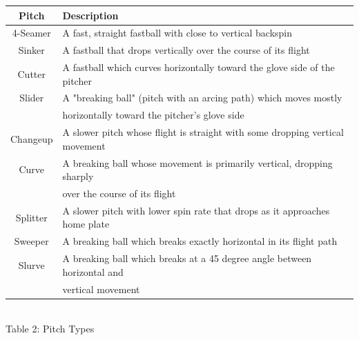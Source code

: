 \documentclass[12 pt]{article}
\begin{document}
\begin{center}
    \begin{tabular}{||c | l||} 
     \hline
     Pitch & Description  \\ [0.5ex] 
     \hline
     4-Seamer & A fast, straight fastball with close to vertical backspin \\
     \hline
     Sinker & A fastball that drops vertically over the course of its flight \\
     \hline
     Cutter & A fastball which curves horizontally toward the glove side of the pitcher \\
     \hline
     Slider & A "breaking ball" (pitch with an arcing path) which moves mostly 
     \\ & horizontally toward the pitcher's glove side\\
     \hline
     Changeup & A slower pitch whose flight is straight with some dropping vertical movement \\ 
     \hline 
     Curve & A breaking ball whose movement is primarily vertical, dropping sharply \\
     & over the course of its flight \\
     \hline 
     Splitter & A slower pitch with lower spin rate that drops as it approaches home plate \\
     \hline
     Sweeper & A breaking ball which breaks exactly horizontal in its flight path \\
     \hline 
     Slurve & A breaking ball which breaks at a 45 degree angle between horizontal and 
     \\ & vertical movement \\
     \hline
    \end{tabular}
    \newline \\ Table 2: Pitch Types
\end{center}
\end{document}

